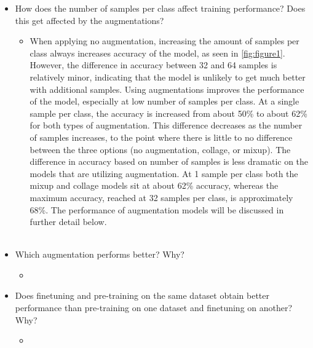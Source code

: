 \documentclass[english,11pt,a4paper,titlepage]{report}
\begin{document}
	\begin{itemize}
		\item How does the number of samples per class affect training performance? Does this get affected by the augmentations?
		\begin{itemize}
			\item When applying no augmentation, increasing the amount of samples per class always increases accuracy of the model, as seen in \ref{fig:figure1}. However, the difference in accuracy between 32 and 64 samples is relatively minor, indicating that the model is unlikely to get much better with additional samples. Using augmentations improves the performance of the model, especially at low number of samples per class. At a single sample per class, the accuracy is increased from about 50\% to about 62\% for both types of augmentation. This difference decreases as the number of samples increases, to the point where there is little to no difference between the three options (no augmentation, collage, or mixup). The difference in accuracy based on number of samples is less dramatic on the models that are utilizing augmentation. At 1 sample per class both the mixup and collage models sit at about 62\% accuracy, whereas the maximum accuracy, reached at 32 samples per class, is approximately 68\%. The performance of augmentation models will be discussed in further detail below.\\
			\\
		\end{itemize}
		\item Which augmentation performs better? Why?
		\begin{itemize}
			\item 
		\end{itemize}
		\item Does finetuning and pre-training on the same dataset obtain better performance than pre-training on one dataset and finetuning on another? Why?
		\begin{itemize}
			\item 
		\end{itemize}
	\end{itemize}
	
	
\end{document}
